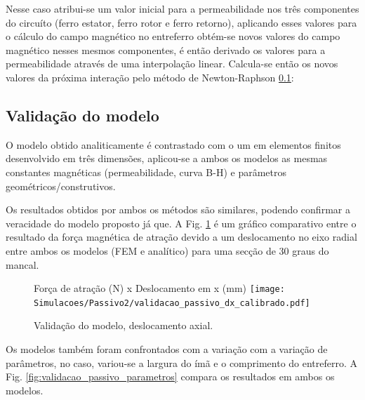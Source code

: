 Nesse caso atribui-se um valor inicial para a permeabilidade nos três componentes do circuíto (ferro estator, ferro rotor e ferro retorno), aplicando esses valores para o cálculo do campo magnético no entreferro obtém-se novos valores do campo magnético nesses mesmos componentes, é então derivado os valores para a permeabilidade através de uma interpolação linear. Calcula-se então os novos valores da próxima interação pelo método de Newton-Raphson \ref{}: 
	


\subsection{Validação do modelo}

O modelo obtido analiticamente é contrastado com o um em elementos finitos desenvolvido em três dimensões, aplicou-se a ambos os modelos as mesmas constantes magnéticas (permeabilidade, curva B-H) e parâmetros geométricos/construtivos.

Os resultados obtidos por ambos os métodos são similares, podendo confirmar a veracidade do modelo proposto já que. A Fig. \ref{fig:validacao_passivo_dx_calibrado} é um gráfico comparativo entre o resultado da força magnética de atração devido a um deslocamento no eixo radial entre ambos os modelos (FEM e analítico) para uma secção de 30 graus do mancal.

\begin{figure}[th!]
\centering
Força de atração (N) x Deslocamento em x (mm)
\texttt{[image: Simulacoes/Passivo2/validacao\_passivo\_dx\_calibrado.pdf]}
\caption{Validação do modelo, deslocamento axial.}
\label{fig:validacao_passivo_dx_calibrado}
\end{figure}

Os modelos também foram confrontados com a variação com a variação de parâmetros, no caso, variou-se a largura do ímã e o comprimento do entreferro. A Fig. \ref{fig:validacao_passivo_parametros} compara os resultados em ambos os modelos.

